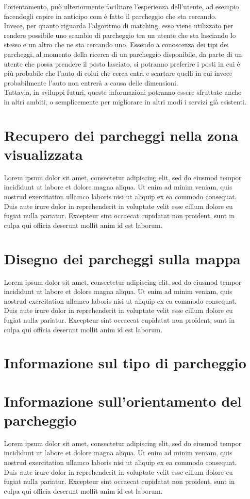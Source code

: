 l'orientamento, può ulteriormente facilitare l'esperienza dell'utente, ad esempio
facendogli capire in anticipo com è fatto il parcheggio che sta cercando.\\
Invece, per quanto riguarda l'algoritmo di matching, esso viene utilizzato per 
rendere possibile uno scambio di parcheggio tra un utente che sta lasciando lo 
stesso e un altro che ne sta cercando uno. Essendo a conoscenza dei tipi dei 
parcheggi, al momento della ricerca di un parcheggio disponibile, da parte di un
utente che possa prendere il posto lasciato, si potranno preferire i posti in cui
è più probabile che l'auto di colui che cerca entri e scartare quelli in cui invece
probabilmente l'auto non entrerà a causa delle dimensioni.\\
Tuttavia, in sviluppi futuri, queste informazioni potranno essere sfruttate anche in
altri ambiti, o semplicemente per migliorare in altri modi i servizi già esistenti.


\section{Recupero dei parcheggi nella zona visualizzata} Lorem ipsum dolor sit amet, consectetur adipiscing elit, sed do eiusmod tempor incididunt ut labore et dolore magna aliqua. Ut enim ad minim veniam, quis nostrud exercitation ullamco laboris nisi ut aliquip ex ea commodo consequat. Duis aute irure dolor in reprehenderit in voluptate velit esse cillum dolore eu fugiat nulla pariatur. Excepteur sint occaecat cupidatat non proident, sunt in culpa qui officia deserunt mollit anim id est laborum.
\section{Disegno dei parcheggi sulla mappa} Lorem ipsum dolor sit amet, consectetur adipiscing elit, sed do eiusmod tempor incididunt ut labore et dolore magna aliqua. Ut enim ad minim veniam, quis nostrud exercitation ullamco laboris nisi ut aliquip ex ea commodo consequat. Duis aute irure dolor in reprehenderit in voluptate velit esse cillum dolore eu fugiat nulla pariatur. Excepteur sint occaecat cupidatat non proident, sunt in culpa qui officia deserunt mollit anim id est laborum.
\section{Informazione sul tipo di parcheggio} 


\section{Informazione sull'orientamento del parcheggio} Lorem ipsum dolor sit amet, consectetur adipiscing elit, sed do eiusmod tempor incididunt ut labore et dolore magna aliqua. Ut enim ad minim veniam, quis nostrud exercitation ullamco laboris nisi ut aliquip ex ea commodo consequat. Duis aute irure dolor in reprehenderit in voluptate velit esse cillum dolore eu fugiat nulla pariatur. Excepteur sint occaecat cupidatat non proident, sunt in culpa qui officia deserunt mollit anim id est laborum.

